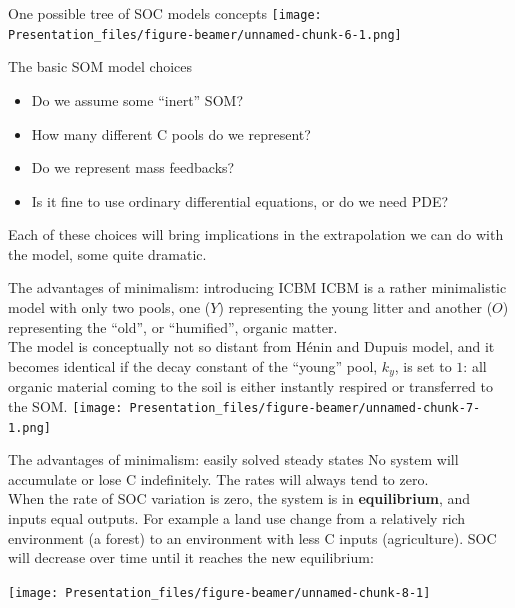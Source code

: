 \documentclass[
  ignorenonframetext,
]{beamer}
\providecommand{\tightlist}{%
  \setlength{\itemsep}{0pt}\setlength{\parskip}{0pt}}
\begin{document}
\begin{frame}{One possible tree of SOC models concepts}
\protect\hypertarget{one-possible-tree-of-soc-models-concepts}{}
\texttt{[image: Presentation\_files/figure-beamer/unnamed-chunk-6-1.png]}
\end{frame}

\begin{frame}{The basic SOM model choices}
\protect\hypertarget{the-basic-som-model-choices}{}
\begin{itemize}
\tightlist
\item
  Do we assume some ``inert'' SOM?
\item
  How many different C pools do we represent?
\item
  Do we represent mass feedbacks?
\item
  Is it fine to use ordinary differential equations, or do we need PDE?
\end{itemize}

Each of these choices will bring implications in the extrapolation we
can do with the model, some quite dramatic.
\end{frame}

\begin{frame}{The advantages of minimalism: introducing ICBM}
\protect\hypertarget{the-advantages-of-minimalism-introducing-icbm}{}
ICBM is a rather minimalistic model with only two pools, one (\(Y\))
representing the young litter and another (\(O\)) representing the
``old'', or ``humified'', organic matter.\\
The model is conceptually not so distant from Hénin and Dupuis model,
and it becomes identical if the decay constant of the ``young'' pool,
\(k_y\), is set to \(1\): all organic material coming to the soil is
either instantly respired or transferred to the SOM.
\texttt{[image: Presentation\_files/figure-beamer/unnamed-chunk-7-1.png]}
\end{frame}

\begin{frame}{The advantages of minimalism: easily solved steady states}
\protect\hypertarget{the-advantages-of-minimalism-easily-solved-steady-states}{}
No system will accumulate or lose C indefinitely. The rates will always
tend to zero.\\
When the rate of SOC variation is zero, the system is in
\textbf{equilibrium}, and inputs equal outputs. For example a land use
change from a relatively rich environment (a forest) to an environment
with less C inputs (agriculture). SOC will decrease over time until it
reaches the new equilibrium:

\texttt{[image: Presentation\_files/figure-beamer/unnamed-chunk-8-1]}
\end{frame}
\end{document}
